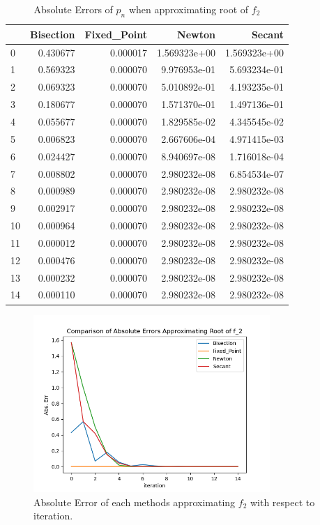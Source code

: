 \documentclass[a4paper,12pt]{article}
\begin{document}
\begin{table}[H]
\begin{center}
	\begin{tabular}{lrrrr}
	\toprule
	{} &  Bisection &  Fixed\_Point &        Newton &        Secant \\
	\midrule
	0  &   0.430677 &     0.000017 &  1.569323e+00 &  1.569323e+00 \\
	1  &   0.569323 &     0.000070 &  9.976953e-01 &  5.693234e-01 \\
	2  &   0.069323 &     0.000070 &  5.010892e-01 &  4.193235e-01 \\
	3  &   0.180677 &     0.000070 &  1.571370e-01 &  1.497136e-01 \\
	4  &   0.055677 &     0.000070 &  1.829585e-02 &  4.345545e-02 \\
	5  &   0.006823 &     0.000070 &  2.667606e-04 &  4.971415e-03 \\
	6  &   0.024427 &     0.000070 &  8.940697e-08 &  1.716018e-04 \\
	7  &   0.008802 &     0.000070 &  2.980232e-08 &  6.854534e-07 \\
	8  &   0.000989 &     0.000070 &  2.980232e-08 &  2.980232e-08 \\
	9  &   0.002917 &     0.000070 &  2.980232e-08 &  2.980232e-08 \\
	10 &   0.000964 &     0.000070 &  2.980232e-08 &  2.980232e-08 \\
	11 &   0.000012 &     0.000070 &  2.980232e-08 &  2.980232e-08 \\
	12 &   0.000476 &     0.000070 &  2.980232e-08 &  2.980232e-08 \\
	13 &   0.000232 &     0.000070 &  2.980232e-08 &  2.980232e-08 \\
	14 &   0.000110 &     0.000070 &  2.980232e-08 &  2.980232e-08 \\
	\bottomrule
	\end{tabular}
	\caption{Absolute Errors of $p_n$ when approximating root of $f_2$}
\end{center}
\end{table}

\begin{figure}[H]
    \centering
     \includegraphics[width=0.8\textwidth]{img/report1/f2_err.png}
     \caption{Absolute Error of each methods approximating $f_2$ with respect to iteration.}
     \label{fig:3}   
\end{figure}
\end{document}
